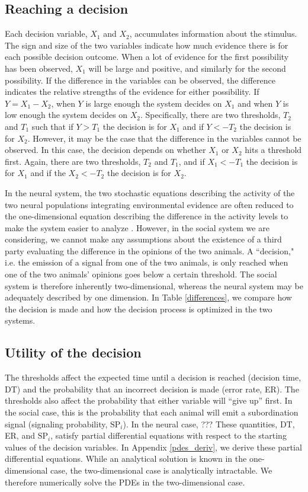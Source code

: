 \documentclass{article}
\begin{document}
\subsection{Reaching a decision }
Each decision variable, $X_1$ and $X_2$, accumulates information about the stimulus.  The sign and size of the two variables indicate how much evidence there is for each possible decision outcome.  When a lot of evidence for the first possibility has been observed, $X_1$ will be large and positive, and similarly for the second possibility.  If the difference in the variables can be observed, the difference indicates the relative strengths of the evidence for either possibility. If $Y=X_1-X_2$, when $Y$ is large enough the system decides on $X_1$ and when $Y$ is low enough the system decides on $X_2$.  Specifically, there are two thresholds, $T_2$ and $T_1$ such that if $Y>T_1$ the decision is for $X_1$ and if $Y<-T_2$ the decision is for $X_2$.  However, it may be the case that the difference in the variables cannot be observed.  In this case, the decision depends on whether $X_1$ or $X_2$ hits a threshold first.  Again, there are two thresholds, $T_2$ and $T_1$, and if $X_1<-T_1$ the decision is for $X_1$ and if the $X_2<-T_2$ the decision is for $X_2$. 

In the neural system, the two stochastic equations describing the activity of the two neural populations integrating environmental evidence are often reduced to the one-dimensional equation describing the difference in the activity levels to make the system easier to analyze \cite{Brown:2005fk,Bogacz:2006uq,Feng:2009kl}.  However, in the social system we are considering, we cannot make any assumptions about the existence of a third party evaluating the difference in the opinions of the two animals.  A ``decision," i.e. the emission of a signal from one of the two animals, is only reached when one of the two animals' opinions goes below a certain threshold.  The social system is therefore inherently two-dimensional, whereas the neural system may be adequately described by one dimension.  In Table \ref{differences}, we compare how the decision is made and how the decision process is optimized in the two systems.

\subsection{Utility of the decision }
The thresholds affect the expected time until a decision is reached (decision time, DT) and the probability that an incorrect decision is made (error rate, ER).  The thresholds also affect the probability that either variable will ``give up'' first.  In the social case, this is the probability that each animal will emit a subordination signal (signaling probability, $\text{SP}_i$).  In the neural case, ??? These quantities, DT, ER, and $\text{SP}_i$, satisfy partial differential equations with respect to the starting values of the decision variables. In Appendix \ref{pdes_deriv}, we derive these partial differential equations.  While an analytical solution is known in the one-dimensional case, the two-dimensional case is analytically intractable.  We therefore numerically solve the PDEs in the two-dimensional case.  
\end{document}
